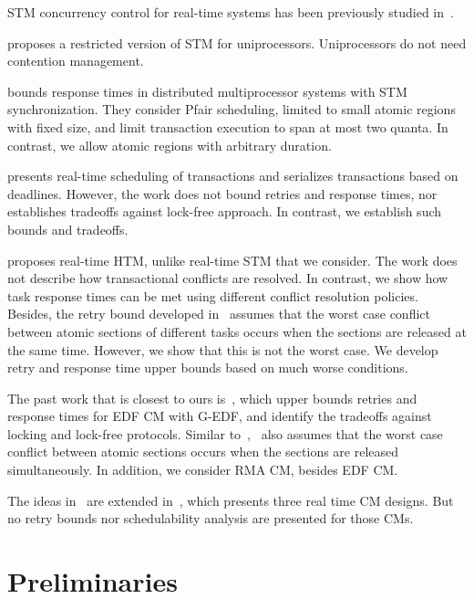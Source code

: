 \documentclass{sig-alternate}
\begin{document}
STM concurrency control for real-time systems has been previously studied in~\cite{manson2006preemptible,fahmy2009bounding,sarni2009real,schoeberl2010rttm,key-1,barrosmanaging}.


\cite{manson2006preemptible} proposes a restricted version of STM for uniprocessors. Uniprocessors do not need contention management.

\cite{fahmy2009bounding} bounds response times in distributed multiprocessor systems with STM synchronization. They consider Pfair scheduling, limited to small atomic regions with fixed size, and limit transaction execution to span at most two quanta. In contrast, we allow atomic regions with  arbitrary duration. 

\cite{sarni2009real} presents real-time scheduling of transactions and serializes transactions based on deadlines. However, the work does not bound retries and response times, nor establishes  tradeoffs against lock-free approach. In contrast, we establish such bounds and tradeoffs.


\cite{schoeberl2010rttm} proposes real-time HTM, unlike real-time STM that we consider. 
The work does not describe how transactional conflicts are resolved. 
In contrast, we show how task response times can be met using different conflict resolution policies. 
Besides, the retry bound developed in~\cite{schoeberl2010rttm} assumes that the worst case conflict between atomic sections of different tasks occurs when the sections are released at the same time. However, we show that this is not the worst case. We develop retry and response time upper bounds based on much worse conditions.


The past work that is closest to ours is~\cite{key-1}, which upper bounds retries and response times for  EDF CM with G-EDF, and identify the tradeoffs against locking and lock-free protocols. Similar to~\cite{schoeberl2010rttm},~\cite{key-1} also assumes that the worst case conflict between atomic sections occurs when the sections are released simultaneously. 
In addition, we consider RMA CM, besides EDF CM.

The ideas in~\cite{key-1} are extended in~\cite{barrosmanaging}, which presents three real time CM designs. But no retry bounds nor schedulability analysis are presented for those CMs. 


\section{Preliminaries}
\label{sec:model}
\end{document}
